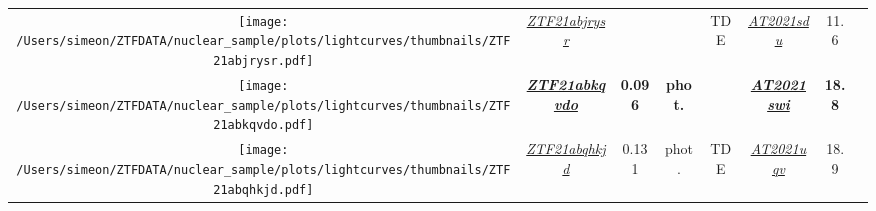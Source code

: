 \begin{table*}
{\begin{tabular}{c c  c  c  c   c  c  c}
      \parbox[c]{12em}{\texttt{[image: /Users/simeon/ZTFDATA/nuclear\_sample/plots/lightcurves/thumbnails/ZTF21abjrysr.pdf]}} & \textit{\href{https://ztfnuclear.simeonreusch.com/transient/ZTF21abjrysr}{ZTF21abjrysr}}          & ~              & ~                       & TDE               &
      \textit{\href{https://www.wis-tns.org/object/2021sdu}{AT2021sdu}}                                                                           & 11.6                                                                                              &                                                                                                              \\
      \parbox[c]{12em}{\texttt{[image: /Users/simeon/ZTFDATA/nuclear\_sample/plots/lightcurves/thumbnails/ZTF21abkqvdo.pdf]}} & \textbf{\textit{\href{https://ztfnuclear.simeonreusch.com/transient/ZTF21abkqvdo}{ZTF21abkqvdo}}} & \textbf{0.096} & \textbf{phot.}          & ~                 &
      \textbf{\textit{\href{https://www.wis-tns.org/object/2021swi}{AT2021swi}}}                                                                  & \textbf{18.8}                                                                                     &                                                                                                              \\
      \parbox[c]{12em}{\texttt{[image: /Users/simeon/ZTFDATA/nuclear\_sample/plots/lightcurves/thumbnails/ZTF21abqhkjd.pdf]}} & \textit{\href{https://ztfnuclear.simeonreusch.com/transient/ZTF21abqhkjd}{ZTF21abqhkjd}}          & 0.131          & phot.                   & TDE               &
      \textit{\href{https://www.wis-tns.org/object/2021uqv}{AT2021uqv}}                                                                           & 18.9                                                                                              &                                                                                                              \\
    \end{tabular}}
\end{table*}






